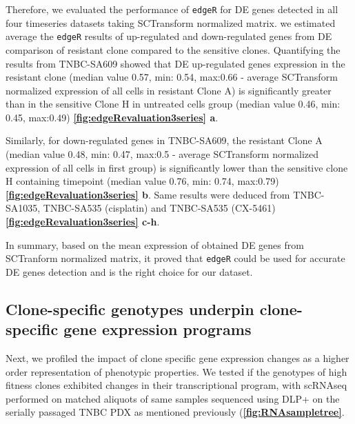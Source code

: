  Therefore, we evaluated the performance of \texttt{edgeR} for DE genes detected in all four timeseries datasets taking SCTransform normalized matrix.
 we estimated average the \texttt{edgeR} results of up-regulated and  down-regulated genes from DE comparison of resistant clone compared to the sensitive clones. Quantifying the results from TNBC-SA609 showed that DE up-regulated genes expression in the resistant clone (median value 0.57, min: 0.54, max:0.66 - average SCTransform normalized expression of all cells in resistant Clone A) is significantly greater than in the sensitive Clone H in untreated cells group (median value 0.46, min: 0.45, max:0.49) \textbf{\autoref{fig:edgeRevaluation3series} a}. 
 
 Similarly, for down-regulated genes in TNBC-SA609, the resistant Clone A (median value 0.48, min: 0.47, max:0.5 - average SCTransform normalized expression of all cells in first group) is significantly lower than the sensitive clone H containing timepoint (median value 0.76, min: 0.74, max:0.79) \textbf{\autoref{fig:edgeRevaluation3series} b}. Same results were deduced from TNBC-SA1035, TNBC-SA535 (cisplatin) and TNBC-SA535 (CX-5461) \textbf{\autoref{fig:edgeRevaluation3series} c-h}. 
 
 In summary, based on the mean expression of obtained DE genes from SCTranform normalized matrix, it proved that \texttt{edgeR} could be used for accurate DE genes detection and is the right choice for our dataset.



\subsection{Clone-specific genotypes underpin clone-specific gene expression programs}
Next, we profiled the impact of clone specific gene expression changes as a higher order representation of phenotypic properties. We tested if the genotypes of high fitness clones exhibited changes in their transcriptional program, with scRNAseq performed on matched aliquots of same samples sequenced using DLP+ on the serially passaged TNBC PDX as mentioned previously (\textbf{\autoref{fig:RNAsampletree}}.


